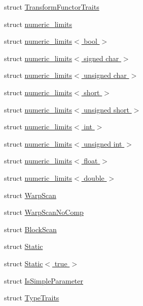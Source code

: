 \begin{DoxyCompactItemize}
struct \hyperlink{structcv_1_1gpu_1_1device_1_1TransformFunctorTraits}{Transform\-Functor\-Traits}
\item 
struct \hyperlink{structcv_1_1gpu_1_1device_1_1numeric__limits}{numeric\-\_\-limits}
\item 
struct \hyperlink{structcv_1_1gpu_1_1device_1_1numeric__limits_3_01bool_01_4}{numeric\-\_\-limits$<$ bool $>$}
\item 
struct \hyperlink{structcv_1_1gpu_1_1device_1_1numeric__limits_3_01signed_01char_01_4}{numeric\-\_\-limits$<$ signed char $>$}
\item 
struct \hyperlink{structcv_1_1gpu_1_1device_1_1numeric__limits_3_01unsigned_01char_01_4}{numeric\-\_\-limits$<$ unsigned char $>$}
\item 
struct \hyperlink{structcv_1_1gpu_1_1device_1_1numeric__limits_3_01short_01_4}{numeric\-\_\-limits$<$ short $>$}
\item 
struct \hyperlink{structcv_1_1gpu_1_1device_1_1numeric__limits_3_01unsigned_01short_01_4}{numeric\-\_\-limits$<$ unsigned short $>$}
\item 
struct \hyperlink{structcv_1_1gpu_1_1device_1_1numeric__limits_3_01int_01_4}{numeric\-\_\-limits$<$ int $>$}
\item 
struct \hyperlink{structcv_1_1gpu_1_1device_1_1numeric__limits_3_01unsigned_01int_01_4}{numeric\-\_\-limits$<$ unsigned int $>$}
\item 
struct \hyperlink{structcv_1_1gpu_1_1device_1_1numeric__limits_3_01float_01_4}{numeric\-\_\-limits$<$ float $>$}
\item 
struct \hyperlink{structcv_1_1gpu_1_1device_1_1numeric__limits_3_01double_01_4}{numeric\-\_\-limits$<$ double $>$}
\item 
struct \hyperlink{structcv_1_1gpu_1_1device_1_1WarpScan}{Warp\-Scan}
\item 
struct \hyperlink{structcv_1_1gpu_1_1device_1_1WarpScanNoComp}{Warp\-Scan\-No\-Comp}
\item 
struct \hyperlink{structcv_1_1gpu_1_1device_1_1BlockScan}{Block\-Scan}
\item 
struct \hyperlink{structcv_1_1gpu_1_1device_1_1Static}{Static}
\item 
struct \hyperlink{structcv_1_1gpu_1_1device_1_1Static_3_01true_01_4}{Static$<$ true $>$}
\item 
struct \hyperlink{structcv_1_1gpu_1_1device_1_1IsSimpleParameter}{Is\-Simple\-Parameter}
\item 
struct \hyperlink{structcv_1_1gpu_1_1device_1_1TypeTraits}{Type\-Traits}

\end{DoxyCompactItemize}
